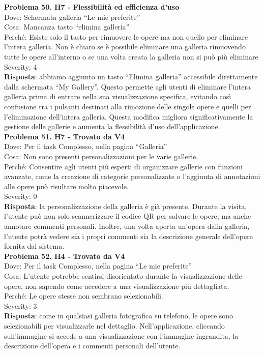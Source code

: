 \documentclass{article}
\begin{document}
\noindent \textbf{Problema 50. H7 - Flessibilità ed efficienza d’uso} \\
Dove: Schermata galleria “Le mie preferite” \\
Cosa: Mancanza tasto “elimina galleria” \\
Perché: Esiste solo il tasto per rimuovere le opere ma non quello per eliminare l’intera galleria. Non è chiaro se è possibile eliminare una galleria rimuovendo tutte le opere all’interno o se una volta creata la galleria non si può più eliminare \\
Severity: 4 \\
\textbf{Risposta}: abbiamo aggiunto un tasto “Elimina galleria” accessibile direttamente dalla schermata “My Gallery”. Questo permette agli utenti di eliminare l’intera galleria prima di entrare nella sua visualizzazione specifica, evitando così confusione tra i pulsanti destinati alla rimozione delle singole opere e quelli per l’eliminazione dell’intera galleria. Questa modifica migliora significativamente la gestione delle gallerie e aumenta la flessibilità d’uso dell’applicazione.\\

\noindent \textbf{Problema 51. H7 - Trovato da V4} \\
Dove: Per il task Complesso, nella pagina “Galleria” \\
Cosa: Non sono presenti personalizzazioni per le varie gallerie. \\
Perché: Consentire agli utenti più esperti di organizzare gallerie con funzioni avanzate, come la creazione di categorie personalizzate o l’aggiunta di annotazioni alle opere può risultare molto piacevole. \\
Severity: 0 \\
\textbf{Risposta}: la personalizzazione della galleria è già presente. Durante la visita, l’utente può non solo scannerizzare il codice QR per salvare le opere, ma anche annotare commenti personali. Inoltre, una volta aperta un’opera dalla galleria, l’utente potrà vedere sia i propri commenti sia la descrizione generale dell’opera fornita dal sistema.\\

\noindent \textbf{Problema 52. H4 - Trovato da V4} \\
Dove: Per il task Complesso, nella pagina “Le mie preferite” \\
Cosa: L'utente potrebbe sentirsi disorientato durante la visualizzazione delle opere, non sapendo come accedere a una visualizzazione più dettagliata. \\
Perché: Le opere stesse non sembrano selezionabili. \\
Severity: 3 \\
\textbf{Risposta}: come in qualsiasi galleria fotografica su telefono, le opere sono selezionabili per visualizzarle nel dettaglio. Nell’applicazione, cliccando sull’immagine si accede a una visualizzazione con l’immagine ingrandita, la descrizione dell’opera e i commenti personali dell’utente.\\
\end{document}
